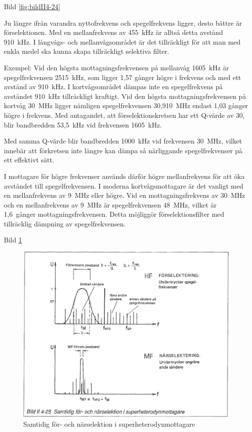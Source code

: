 Bild \ref{fig:bildII4-24}

Ju längre ifrån varandra nyttofrekvens och spegelfrekvens ligger,
desto bättre är förselektionen. Med en mellanfrekvens av 455~kHz är
alltså detta avstånd 910~kHz. I långvågs- och mellanvågsområdet är det
tillräckligt för att man med enkla medel ska kunna skapa
tillräckligt selektiva filter.

Exempel: Vid den högsta mottagningsfrekvensen på mellanvåg 1605~kHz är
spegelfrekvensen 2515~kHz, som ligger 1,57 gånger högre i frekvens och
med ett avstånd av 910~kHz. I kortvågsområdet dämpas inte en
spegelfrekvens på avståndet 910~kHz tillräckligt kraftigt. Vid den
högsta mottagningsfrekvensen på kortvåg 30~MHz ligger nämligen
spegelfrekvensen 30,910~MHz endast 1,03 gånger högre i frekvens. Med
antagandet, att förselektionskretsen har ett Q-värde av 30, blir
bandbredden 53,5~kHz vid frekvensen 1605~kHz.

Med samma Q-värde blir bandbredden 1000~kHz vid frekvensen 30~MHz,
vilket innebär att förkretsen inte längre kan dämpa så närliggande
spegelfrekvenser på ett effektivt sätt.

I mottagare för högre frekvenser används därför högre mellanfrekvens
för att öka avståndet till spegelfrekvensen.
I moderna kortvågsmottagare är det vanligt med en mellanfrekvens av 9~MHz
eller högre.
Vid en mottagningsfrekvens av 30~MHz och en mellanfrekvens av 9~MHz är
spegelfrekvensen 48~MHz, vilket är 1,6~gånger mottagningsfrekvensen.
Detta möjliggör förselektionsfilter med tillräcklig dämpning av
spegelfrekvensen.

Bild \ref{fig:bildII4-25}

\begin{figure}
  \includegraphics[width=\textwidth]{images/bild_2_4-25}
  \caption{Samtidig för- och närselektion i superheterodynmottagare}
  \label{fig:bildII4-25}
\end{figure}

